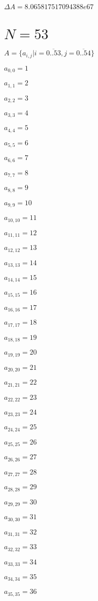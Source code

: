 \documentclass[a4paper,12pt]{article}
\begin{document}
$\Delta A = 8.065817517094388e67$



\section{ $N = 53$ }
$A = \{ a _{ i, j } | i = \overline { 0..53 }, j = \overline { 0..54 } \}$

$a _{ 0, 0 } = 1$

$a _{ 1, 1 } = 2$

$a _{ 2, 2 } = 3$

$a _{ 3, 3 } = 4$

$a _{ 4, 4 } = 5$

$a _{ 5, 5 } = 6$

$a _{ 6, 6 } = 7$

$a _{ 7, 7 } = 8$

$a _{ 8, 8 } = 9$

$a _{ 9, 9 } = 10$

$a _{ 10, 10 } = 11$

$a _{ 11, 11 } = 12$

$a _{ 12, 12 } = 13$

$a _{ 13, 13 } = 14$

$a _{ 14, 14 } = 15$

$a _{ 15, 15 } = 16$

$a _{ 16, 16 } = 17$

$a _{ 17, 17 } = 18$

$a _{ 18, 18 } = 19$

$a _{ 19, 19 } = 20$

$a _{ 20, 20 } = 21$

$a _{ 21, 21 } = 22$

$a _{ 22, 22 } = 23$

$a _{ 23, 23 } = 24$

$a _{ 24, 24 } = 25$

$a _{ 25, 25 } = 26$

$a _{ 26, 26 } = 27$

$a _{ 27, 27 } = 28$

$a _{ 28, 28 } = 29$

$a _{ 29, 29 } = 30$

$a _{ 30, 30 } = 31$

$a _{ 31, 31 } = 32$

$a _{ 32, 32 } = 33$

$a _{ 33, 33 } = 34$

$a _{ 34, 34 } = 35$

$a _{ 35, 35 } = 36$
\end{document}

